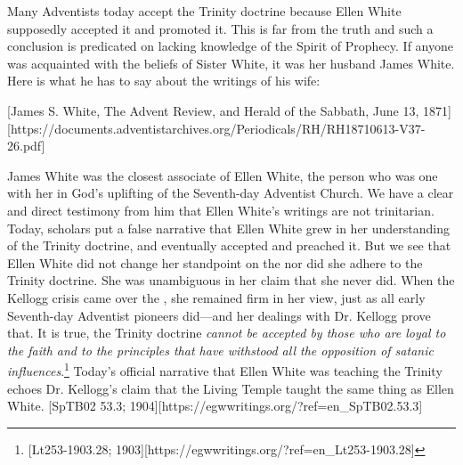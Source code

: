 Many Adventists today accept the Trinity doctrine because Ellen White supposedly accepted it and promoted it. This is far from the truth and such a conclusion is predicated on lacking knowledge of the Spirit of Prophecy. If anyone was acquainted with the beliefs of Sister White, it was her husband James White. Here is what he has to say about the writings of his wife:

[James S. White, The Advent Review, and Herald of the Sabbath, June 13, 1871][https://documents.adventistarchives.org/Periodicals/RH/RH18710613-V37-26.pdf]

James White was the closest associate of Ellen White, the person who was one with her in God’s uplifting of the Seventh-day Adventist Church. We have a clear and direct testimony from him that Ellen White’s writings are not trinitarian. Today, scholars put a false narrative that Ellen White grew in her understanding of the Trinity doctrine, and eventually accepted and preached it. But we see that Ellen White did not change her standpoint on the  nor did she adhere to the Trinity doctrine. She was unambiguous in her claim that she never did. When the Kellogg crisis came over the , she remained firm in her view, just as all early Seventh-day Adventist pioneers did—and her dealings with Dr. Kellogg prove that. It is true, the Trinity doctrine \textit{cannot be accepted by those who are loyal to the faith and to the principles that have withstood all the opposition of satanic influences}.\footnote{[Lt253-1903.28; 1903][https://egwwritings.org/?ref=en\_Lt253-1903.28]} Today’s official narrative that Ellen White was teaching the Trinity echoes Dr. Kellogg’s claim that the Living Temple taught the same thing as Ellen White. [SpTB02 53.3; 1904][https://egwwritings.org/?ref=en\_SpTB02.53.3]

